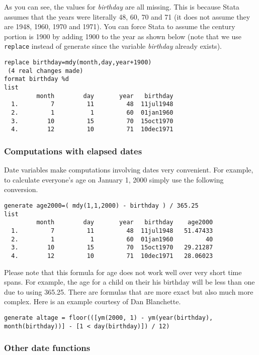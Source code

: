 As you can see, the values for \textit{birthday} are all missing. This is because Stata assumes that the years were literally 48, 60, 70 and 71 (it does not assume they are 1948, 1960, 1970 and 1971). You can force Stata to assume the century portion is 1900 by adding 1900 to the year as shown below (note that we use \lstinline{replace} instead of generate since the variable \textit{birthday} already exists).

\begin{lstlisting}
replace birthday=mdy(month,day,year+1900)
 (4 real changes made)
format birthday %d
list
         month        day       year   birthday
  1.         7         11         48  11jul1948
  2.         1          1         60  01jan1960
  3.        10         15         70  15oct1970
  4.        12         10         71  10dec1971
\end{lstlisting}

\subsubsection{Computations with elapsed dates}

Date variables make computations involving dates very convenient. For example, to calculate everyone's age on January 1, 2000 simply use the following conversion.

\begin{lstlisting}
generate age2000=( mdy(1,1,2000) - birthday ) / 365.25
list
         month        day       year   birthday    age2000
  1.         7         11         48  11jul1948   51.47433
  2.         1          1         60  01jan1960         40
  3.        10         15         70  15oct1970   29.21287
  4.        12         10         71  10dec1971   28.06023
\end{lstlisting}

Please note that this formula for age does not work well over very short time spans. For example, the age for a child on their his birthday will be less than one due to using 365.25. There are formulas that are more exact but also much more complex. Here is an example courtesy of Dan Blanchette.

\begin{lstlisting}
generate altage = floor(([ym(2000, 1) - ym(year(birthday), month(birthday))] - [1 < day(birthday)]) / 12)
\end{lstlisting}

\subsubsection{Other date functions}


